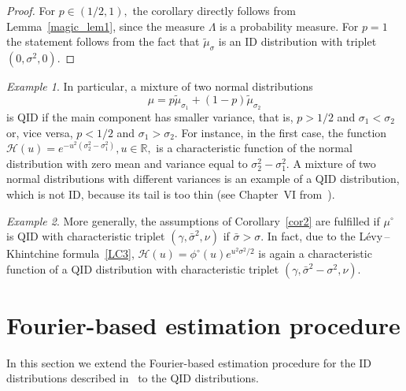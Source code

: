 \documentclass[a4paper,11pt]{article}
\theoremstyle{definition}
\newcommand{\I}{{\rm{1}}}
\newcommand{\R}{{\mathbb{R}}}
\newcommand{\1}{\mathbb{I}}
\def\R{\mathbb{R}}
\theoremstyle{remark}
\newtheorem{ex}{Example}
\begin{document}
\begin{proof}
For \(p \in (1/2, 1),\) the corollary directly follows from Lemma~\ref{magic_lem1}, since the measure \(\Lambda\) is a probability measure. For \(p=1\) the statement follows from the fact that \(\tilde{\mu}_\sigma\) is an ID distribution with triplet \((0, \sigma^2,0)\).
\end{proof}
\begin{ex}\label{ex2}
In particular, a mixture of two normal distributions $$\mu = p\tilde\mu_{\sigma_1} + (1-p) \tilde\mu_{\sigma_2}$$  is QID if the main component has smaller variance, that is, \(p>1/2\) and \(\sigma_1 < \sigma_2\) or, vice versa, \(p<1/2\) and \(\sigma_1 > \sigma_2\). For instance, in the first case, the function \(\mathcal{H}(u) = e^{- u^2(\sigma_2^2 -\sigma_1^2)} , u \in \R,\) is a characteristic function of the normal distribution with zero mean and variance equal to \(\sigma_2^2 -\sigma_1^2.\) A mixture of two normal distributions with different variances is an example of a QID distribution, which is not ID, because its tail is too thin (see Chapter~VI from~\cite{SvH2004}). 
\end{ex}
\begin{ex} \label{ex3}
More generally, the assumptions of Corollary~\ref{cor2} are fulfilled if \(\mu^\circ\) is QID with characteristic triplet \((\gamma, \bar\sigma^2, \nu)\) if \(\bar{\sigma} > \sigma.\) In fact, due to the L{\'e}vy\,--\,Khintchine formula~\eqref{LC3}, \(\mathcal{H}(u)=\phi^\circ(u) e^{u^2 \sigma^2 /2}\) is again a characteristic function of a QID distribution with characteristic triplet \((\gamma, \bar\sigma^2 - \sigma^2, \nu).\) %
\end{ex}
\section{Fourier-based estimation procedure}
\label{sec3}
%
In this section we extend the Fourier-based estimation procedure for the ID distributions described in~\cite{BR2015} to the QID distributions.%
\end{document}
